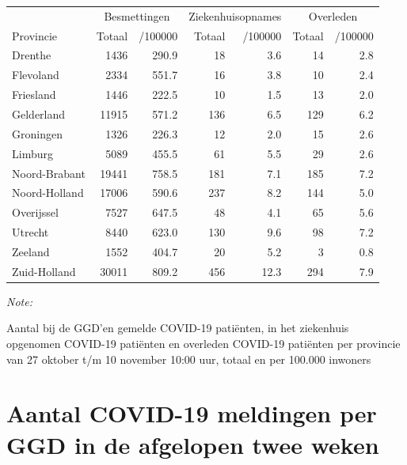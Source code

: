 \documentclass[
  english,
  man,floatsintext]{apa6}
\begin{document}
\begin{table}[H]
\centering
\begin{threeparttable}
\begin{tabular}{lrrrrrr}
\toprule
\multicolumn{1}{c}{ } & \multicolumn{2}{c}{Besmettingen} & \multicolumn{2}{c}{Ziekenhuisopnames} & \multicolumn{2}{c}{Overleden} \\
\cmidrule(l{3pt}r{3pt}){2-3} \cmidrule(l{3pt}r{3pt}){4-5} \cmidrule(l{3pt}r{3pt}){6-7}
Provincie & Totaal & /100000 & Totaal & /100000 & Totaal & /100000\\
\midrule
Drenthe & 1436 & 290.9 & 18 & 3.6 & 14 & 2.8\\
Flevoland & 2334 & 551.7 & 16 & 3.8 & 10 & 2.4\\
Friesland & 1446 & 222.5 & 10 & 1.5 & 13 & 2.0\\
Gelderland & 11915 & 571.2 & 136 & 6.5 & 129 & 6.2\\
Groningen & 1326 & 226.3 & 12 & 2.0 & 15 & 2.6\\
Limburg & 5089 & 455.5 & 61 & 5.5 & 29 & 2.6\\
Noord-Brabant & 19441 & 758.5 & 181 & 7.1 & 185 & 7.2\\
Noord-Holland & 17006 & 590.6 & 237 & 8.2 & 144 & 5.0\\
Overijssel & 7527 & 647.5 & 48 & 4.1 & 65 & 5.6\\
Utrecht & 8440 & 623.0 & 130 & 9.6 & 98 & 7.2\\
Zeeland & 1552 & 404.7 & 20 & 5.2 & 3 & 0.8\\
Zuid-Holland & 30011 & 809.2 & 456 & 12.3 & 294 & 7.9\\
\bottomrule
\end{tabular}
\begin{tablenotes}
\item \textit{Note: } 
\item Aantal bij de GGD’en gemelde COVID-19 patiënten, in het ziekenhuis opgenomen COVID-19 patiënten en overleden COVID-19 patiënten per provincie van 27 oktober t/m 10 november 10:00 uur, totaal en per 100.000 inwoners
\end{tablenotes}
\end{threeparttable}
\end{table}

\newpage

\hypertarget{aantal-covid-19-meldingen-per-ggd-in-de-afgelopen-twee-weken}{%
\section{Aantal COVID-19 meldingen per GGD in de afgelopen twee weken}\label{aantal-covid-19-meldingen-per-ggd-in-de-afgelopen-twee-weken}}
\end{document}
